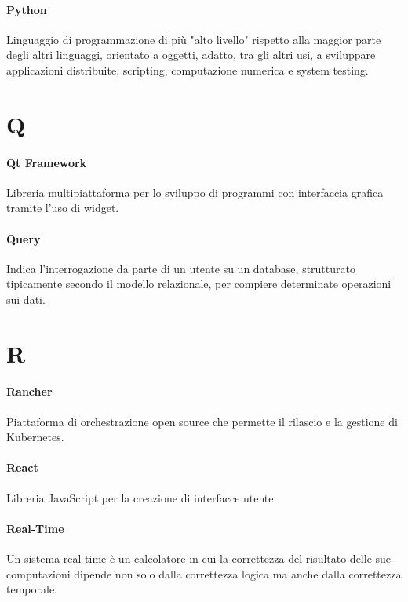 \documentclass[]{article}
\begin{document}
	\paragraph*{Python}
	Linguaggio di programmazione di più "alto livello" rispetto alla maggior parte degli altri linguaggi, orientato a oggetti, adatto, tra gli altri usi, a sviluppare applicazioni distribuite, scripting, computazione numerica e system testing.

	\newpage

	\section*{Q}

	\paragraph*{Qt Framework}
	Libreria multipiattaforma per lo sviluppo di programmi con interfaccia grafica tramite l'uso di widget.

	\paragraph*{Query}
	Indica l'interrogazione da parte di un utente su un database, strutturato tipicamente secondo il modello relazionale, per compiere determinate operazioni sui dati.

	\newpage

	\section*{R}

	\paragraph*{Rancher}
	Piattaforma di orchestrazione open source che permette il rilascio e la gestione di Kubernetes.

	\paragraph*{React}
	Libreria JavaScript per la creazione di interfacce utente.

	\paragraph*{Real-Time}
	Un sistema real-time è un calcolatore in cui la correttezza del risultato delle sue computazioni dipende non solo dalla correttezza logica ma anche dalla correttezza temporale.
\end{document}
